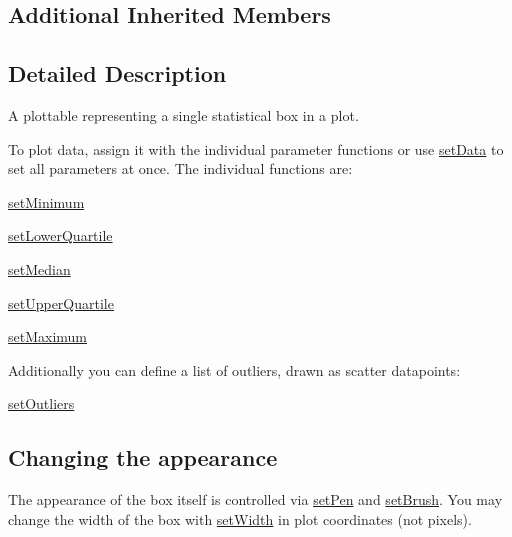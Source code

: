 \subsection*{Additional Inherited Members}


\subsection{Detailed Description}
A plottable representing a single statistical box in a plot. 



To plot data, assign it with the individual parameter functions or use \hyperlink{class_q_c_p_statistical_box_adf50c57b635edb12470c0e4a986aff37}{set\+Data} to set all parameters at once. The individual functions are\+: \begin{DoxyItemize}
\item \hyperlink{class_q_c_p_statistical_box_a84ff7cc61ba44890f0c3e0c99c19941e}{set\+Minimum} \item \hyperlink{class_q_c_p_statistical_box_a680941af5e23d902013962fa67223f9e}{set\+Lower\+Quartile} \item \hyperlink{class_q_c_p_statistical_box_a65970e77a897da4ecb4b15300868aad3}{set\+Median} \item \hyperlink{class_q_c_p_statistical_box_a65a1375f941c5a2077b5201229e89346}{set\+Upper\+Quartile} \item \hyperlink{class_q_c_p_statistical_box_acec5ad1901f00f2c5387cfb4d9787eb3}{set\+Maximum}\end{DoxyItemize}
Additionally you can define a list of outliers, drawn as scatter datapoints\+: \begin{DoxyItemize}
\item \hyperlink{class_q_c_p_statistical_box_af9bc09620e0bf93bf444ee35e5800d1d}{set\+Outliers}\end{DoxyItemize}
\hypertarget{class_q_c_p_statistical_box_appearance}{}\subsection{Changing the appearance}\label{class_q_c_p_statistical_box_appearance}
The appearance of the box itself is controlled via \hyperlink{class_q_c_p_abstract_plottable_ab74b09ae4c0e7e13142fe4b5bf46cac7}{set\+Pen} and \hyperlink{class_q_c_p_abstract_plottable_a7a4b92144dca6453a1f0f210e27edc74}{set\+Brush}. You may change the width of the box with \hyperlink{class_q_c_p_statistical_box_a0b62775bd67301b1eba5c785f2b26f14}{set\+Width} in plot coordinates (not pixels).

